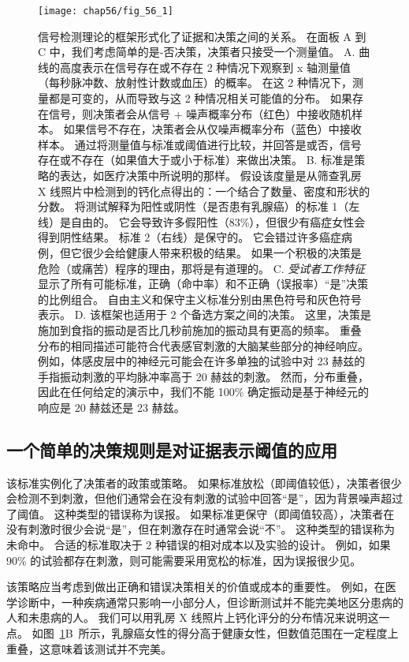 \begin{figure}[htbp]
	\centering
	\texttt{[image: chap56/fig\_56\_1]}
	\caption{信号检测理论的框架形式化了证据和决策之间的关系。
		在面板 A 到 C 中，我们考虑简单的是-否决策，决策者只接受一个测量值。
		A. 曲线的高度表示在信号存在或不存在 2 种情况下观察到 x 轴测量值（每秒脉冲数、放射性计数或血压）的概率。
		在这 2 种情况下，测量都是可变的，从而导致与这 2 种情况相关可能值的分布。
		如果存在信号，则决策者会从信号 + 噪声概率分布（红色）中接收随机样本。
		如果信号不存在，决策者会从仅噪声概率分布（蓝色）中接收样本。
		通过将测量值与标准或阈值进行比较，并回答是或否，信号存在或不存在（如果值大于或小于标准）来做出决策。
		B. 标准是策略的表达，如医疗决策中所说明的那样。
		假设该度量是从筛查乳房 X 线照片中检测到的钙化点得出的：一个结合了数量、密度和形状的分数。
		将测试解释为阳性或阴性（是否患有乳腺癌）的标准 1（左线）是自由的。
		它会导致许多假阳性（83\%），但很少有癌症女性会得到阴性结果。
		标准 2（右线）是保守的。
		它会错过许多癌症病例，但它很少会给健康人带来积极的结果。
		如果一个积极的决策是危险（或痛苦）程序的理由，那将是有道理的。
		C. \textit{受试者工作特征}显示了所有可能标准，正确（命中率）和不正确（误报率）“是”决策的比例组合。
		自由主义和保守主义标准分别由黑色符号和灰色符号表示。
		D. 该框架也适用于 2 个备选方案之间的决策。
		这里，决策是施加到食指的振动是否比几秒前施加的振动具有更高的频率。
		重叠分布的相同描述可能符合代表感官刺激的大脑某些部分的神经响应。
		例如，体感皮层中的神经元可能会在许多单独的试验中对 23 赫兹的手指振动刺激的平均脉冲率高于 20 赫兹的刺激。
		然而，分布重叠，因此在任何给定的演示中，我们不能 100\% 确定振动是基于神经元的响应是 20 赫兹还是 23 赫兹。}
	\label{fig:56_1}
\end{figure}


\subsection{一个简单的决策规则是对证据表示阈值的应用}

该标准实例化了决策者的政策或策略。
如果标准放松（即阈值较低），决策者很少会检测不到刺激，但他们通常会在没有刺激的试验中回答“是”，因为背景噪声超过了阈值。
这种类型的错误称为误报。
如果标准更保守（即阈值较高），决策者在没有刺激时很少会说“是”，但在刺激存在时通常会说“不”。
这种类型的错误称为未命中。
合适的标准取决于 2 种错误的相对成本以及实验的设计。
例如，如果 90\% 的试验都存在刺激，则可能需要采用宽松的标准，因为误报很少见。


该策略应当考虑到做出正确和错误决策相关的价值或成本的重要性。
例如，在医学诊断中，一种疾病通常只影响一小部分人，但诊断测试并不能完美地区分患病的人和未患病的人。
我们可以用乳房 X 线照片上钙化评分的分布情况来说明这一点。
如图~\ref{fig:56_1}B~所示，乳腺癌女性的得分高于健康女性，但数值范围在一定程度上重叠，这意味着该测试并不完美。


